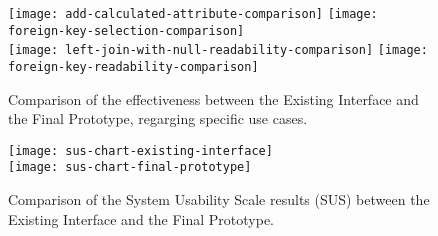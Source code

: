 \begin{figure}[tb]
    \centering
      {\texttt{[image: add-calculated-attribute-comparison]}}%
    {\texttt{[image: foreign-key-selection-comparison]}}%
    \\
      {\texttt{[image: left-join-with-null-readability-comparison]}}%
    {\texttt{[image: foreign-key-readability-comparison]}}%
    \caption{Comparison of the effectiveness between the Existing Interface and the Final Prototype, regarging specific use cases.}
    \label{fig:specificComparisons}
  \end{figure}

\begin{figure}[tb]
    \centering
      {\texttt{[image: sus-chart-existing-interface]}}%
      \\
    {\texttt{[image: sus-chart-final-prototype]}}%
  \caption{Comparison of the System Usability Scale results (SUS) between the Existing Interface and the Final Prototype.}
    \label{fig:susChartComparison}
  \end{figure}

